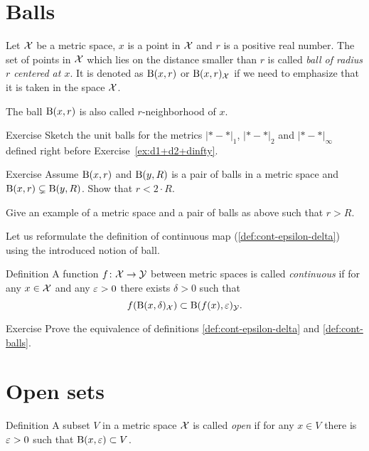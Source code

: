 \section{Balls}

Let $\mathcal{X}$ be a metric space, 
$x$ is a point in $\mathcal{X}$ 
and $r$ is a positive real number.
The set of points in $\mathcal{X}$ which lies on the distance smaller than $r$ is called \emph{ball of radius $r$ centered at $x$}.
It is denoted as $\mathrm{B}(x,r)$ 
or $\mathrm{B}(x,r)_{\mathcal{X}}$ if we need to emphasize that it is taken in the space $\mathcal{X}$.

The ball $\mathrm{B}(x,r)$ is also called $r$-neighborhood of $x$.

\begin{thm}{Exercise}\label{ex:d1+d2+dinfty-balls}
Sketch the unit balls for the metrics $|{*}-{*}|_1$, $|{*}-{*}|_2$ and $|{*}-{*}|_\infty$ defined right before Exercise~\ref{ex:d1+d2+dinfty}.
\end{thm}

\begin{thm}{Exercise}
Assume $\mathrm{B}(x,r)$  and $\mathrm{B}(y,R)$ is a pair of balls in a metric space 
and $\mathrm{B}(x,r)\subsetneq \mathrm{B}(y,R)$.
Show that $r<2\cdot R$.

Give an example of a metric space and a pair of balls as above such that $r> R$.
\end{thm}

Let us reformulate the definition of continuous map (\ref{def:cont-epsilon-delta}) using the introduced notion of ball.

\begin{thm}{Definition}\label{def:cont-balls}
A function $f\colon\mathcal{X}\to\mathcal{Y}$ between metric spaces is called \emph{continuous} if for any $x\in \mathcal{X}$ and any $\varepsilon>0$ there exists $\delta>0$ such that 
\[f(\mathrm{B}(x,\delta)_{\mathcal{X}})\subset\mathrm{B}(f(x),\varepsilon)_{\mathcal{Y}}.\]

\end{thm}

\begin{thm}{Exercise}
Prove the equivalence of definitions \ref{def:cont-epsilon-delta} and \ref{def:cont-balls}.
\end{thm}



\section{Open sets}

\begin{thm}{Definition}\label{def:open}
A subset $V$ in a metric space $\mathcal{X}$ is called \emph{open} if for any $x\in V$ there is $\varepsilon>0$ such that $\mathrm{B}(x,\varepsilon)\subset V$.
\end{thm}

